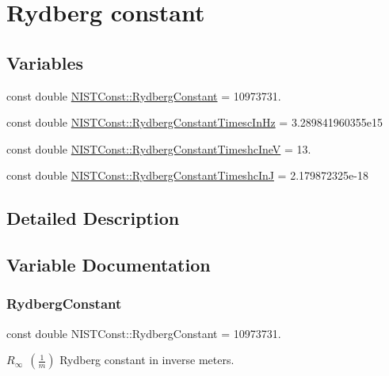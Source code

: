 \hypertarget{group___rydberg_constant}{}\section{Rydberg constant}
\label{group___rydberg_constant}
\subsection*{Variables}
\begin{DoxyCompactItemize}
\item 
const double \hyperlink{group___rydberg_constant_gaa434f78f9fead2fcf2e129a137853e26}{N\+I\+S\+T\+Const\+::\+Rydberg\+Constant} = 10973731.
\item 
const double \hyperlink{group___rydberg_constant_ga473e14f2663eccecd987928be1d512ad}{N\+I\+S\+T\+Const\+::\+Rydberg\+Constant\+Timesc\+In\+Hz} = 3.\+289841960355e15
\item 
const double \hyperlink{group___rydberg_constant_ga77c7dd314342e7f121d9b8775a45d20f}{N\+I\+S\+T\+Const\+::\+Rydberg\+Constant\+Timeshc\+IneV} = 13.
\item 
const double \hyperlink{group___rydberg_constant_gaa4164006d51dbf240eb83065e83bddec}{N\+I\+S\+T\+Const\+::\+Rydberg\+Constant\+Timeshc\+InJ} = 2.\+179872325e-\/18
\end{DoxyCompactItemize}


\subsection{Detailed Description}


\subsection{Variable Documentation}
\mbox{\label{group___rydberg_constant_gaa434f78f9fead2fcf2e129a137853e26}} 
\subsubsection{\texorpdfstring{Rydberg\+Constant}{RydbergConstant}}
{\footnotesize\ttfamily const double N\+I\+S\+T\+Const\+::\+Rydberg\+Constant = 10973731.}

$R_\infty \ \ (\frac{1}{m})$ Rydberg constant in inverse meters. \mbox{\label{group___rydberg_constant_ga473e14f2663eccecd987928be1d512ad}} 
